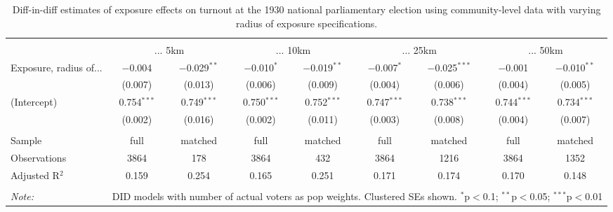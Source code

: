 
\begin{table}[!htbp] \centering 
  \caption{Diff-in-diff estimates of exposure effects on turnout at the 1930 national parliamentary election using community-level data with varying radius of exposure specifications.\vspace{-.25cm}} 
  \label{tab:turnout-radius-dd} 
\scriptsize 
\begin{tabular}{@{\extracolsep{5pt}}lcccccccc} 
\\[-1.8ex]\hline 
\hline \\[-1.8ex] 
 & \multicolumn{2}{c}{... 5km} & \multicolumn{2}{c}{... 10km} & \multicolumn{2}{c}{... 25km} & \multicolumn{2}{c}{... 50km} \\ 
 \cmidrule(r){2-3}\cmidrule(r){4-5}\cmidrule(r){6-7}\cmidrule(r){8-9}Exposure, radius of... & $-$0.004 & $-$0.029$^{**}$ & $-$0.010$^{*}$ & $-$0.019$^{**}$ & $-$0.007$^{*}$ & $-$0.025$^{***}$ & $-$0.001 & $-$0.010$^{**}$ \\ 
  & (0.007) & (0.013) & (0.006) & (0.009) & (0.004) & (0.006) & (0.004) & (0.005) \\ 
  (Intercept) & 0.754$^{***}$ & 0.749$^{***}$ & 0.750$^{***}$ & 0.752$^{***}$ & 0.747$^{***}$ & 0.738$^{***}$ & 0.744$^{***}$ & 0.734$^{***}$ \\ 
  & (0.002) & (0.016) & (0.002) & (0.011) & (0.003) & (0.008) & (0.004) & (0.007) \\ 
 \hline \\[-1.8ex] 
Sample & full & matched & full & matched & full & matched & full & matched \\ 
Observations & 3864 & 178 & 3864 & 432 & 3864 & 1216 & 3864 & 1352 \\ 
Adjusted R$^{2}$ & 0.159 & 0.254 & 0.165 & 0.251 & 0.171 & 0.174 & 0.170 & 0.148 \\ 
\hline 
\hline \\[-1.8ex] 
\textit{Note:}  & \multicolumn{8}{r}{DID models with number of actual voters as pop weights. Clustered SEs shown. $^{*}$p$<$0.1; $^{**}$p$<$0.05; $^{***}$p$<$0.01} \\ 
\end{tabular} 
\end{table} 
